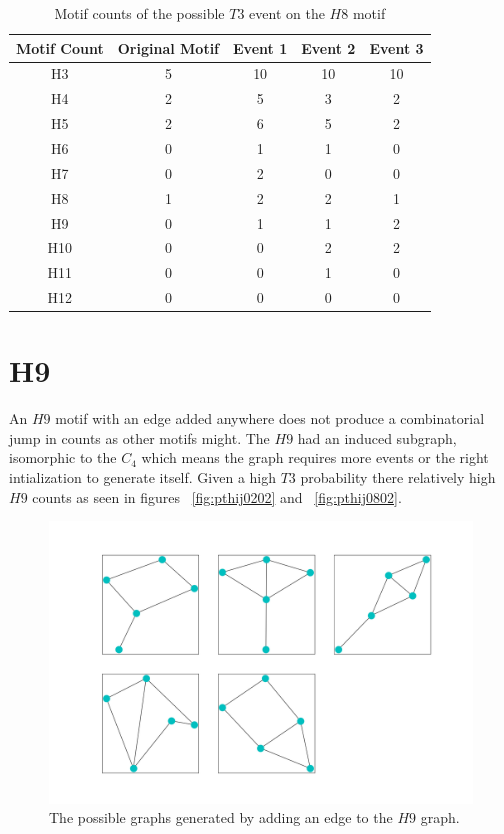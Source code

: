 \begin{table}
    \centering
    \begin{tabular}{||c c c c c||} 
    \hline
    Motif Count & Original Motif & Event 1 & Event 2 & Event 3 \\ [0.5ex] 
    \hline\hline
    H3 & 5 & 10 & 10 & 10\\ 
    \hline
    H4 & 2 & 5 & 3 & 2 \\
    \hline
    H5 & 2 & 6 & 5 & 2 \\
    \hline
    H6 & 0 & 1 & 1 & 0 \\
    \hline
    H7 & 0 & 2 & 0 & 0 \\
    \hline
    H8 & 1 & 2 & 2 & 1\\
    \hline
    H9 & 0 & 1 & 1 & 2\\
    \hline
    H10  & 0 & 0 & 2& 2 \\
    \hline
    H11  & 0 & 0 & 1& 0 \\
    \hline
    H12  & 0 & 0 & 0& 0 \\
    \hline
   \end{tabular}
   \caption{Motif counts of the possible $T3$ event on the $H8$ motif}
   \label{table:17}
\end{table}

\section{H9}
An $H9$ motif with an edge added anywhere does not produce a combinatorial jump in counts as
 other motifs might. The $H9$ had an induced subgraph, isomorphic to the $C_4$ which
 means the graph requires more events or the right intialization to generate itself. Given
 a high $T3$ probability there relatively high $H9$ counts as seen in figures ~\ref{fig:pthij0202}
and ~\ref{fig:pthij0802}.

\begin{figure}
    \includegraphics[width=14cm]{Images/H9_T3_evolution.png}
    \centering
    \caption{The possible graphs generated by adding an edge to the $H9$ graph.}
\end{figure}

